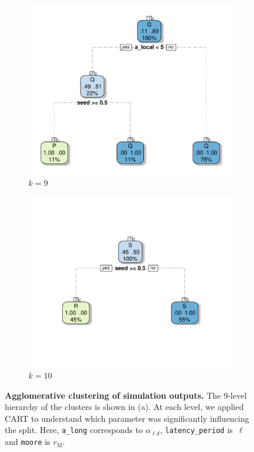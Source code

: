 \documentclass[10pt]{article}
\newcommand{\ald}{\alpha_{\ell d}}
\newcommand{\mooreRange}{r_\mathrm{M}}
\theoremstyle{definition}
\begin{document}
\begin{figure}[ht]
\begin{subfigure}[b]{.32\textwidth}
\includegraphics[width=\textwidth]{../clustering/results/agglomerative/cart_cPQ_agg.pdf}
\caption{$k=9$}
\end{subfigure}
\begin{subfigure}[b]{.32\textwidth}
\includegraphics[width=\textwidth]{../clustering/results/agglomerative/cart_cRS_agg.pdf}
\caption{$k=10$}
\end{subfigure}
\caption{\textbf{Agglomerative clustering of simulation outputs.} The
9-level hierarchy of the clusters is shown in (a). At each level, we
applied CART to understand which parameter was significantly influencing
the split. Here, \texttt{a\_long} corresponds to $\ald$,
\texttt{latency\_period} is~$\ell$ and \texttt{moore} is $\mooreRange$.
\label{fig:cartAgglomerative}}
\end{figure}
\end{document}
